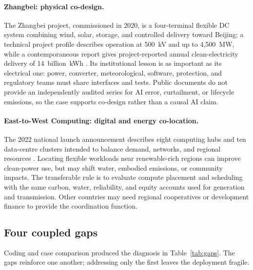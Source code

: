 \documentclass[12pt]{article}
\begin{document}
\paragraph{Zhangbei: physical co-design.}
The Zhangbei project, commissioned in 2020, is a four-terminal flexible DC system combining wind, solar, storage, and controlled delivery toward Beijing; a technical project profile describes operation at 500~kV and up to 4,500~MW, while a contemporaneous report gives project-reported annual clean-electricity delivery of 14~billion~kWh \citep{sgcc2020,chinadaily2020}. Its institutional lesson is as important as its electrical one: power, converter, meteorological, software, protection, and regulatory teams must share interfaces and tests. Public documents do not provide an independently audited series for AI error, curtailment, or lifecycle emissions, so the case supports co-design rather than a causal AI claim.

\paragraph{East-to-West Computing: digital and energy co-location.}
The 2022 national launch announcement describes eight computing hubs and ten data-centre clusters intended to balance demand, networks, and regional resources \citep{ndrc2022}. Locating flexible workloads near renewable-rich regions can improve clean-power use, but may shift water, embodied emissions, or community impacts. The transferable rule is to evaluate compute placement and scheduling with the same carbon, water, reliability, and equity accounts used for generation and transmission. Other countries may need regional cooperatives or development finance to provide the coordination function.

\subsection{Four coupled gaps}
Coding and case comparison produced the diagnosis in Table~\ref{tab:gaps}. The gaps reinforce one another; addressing only the first leaves the deployment fragile.
\end{document}
